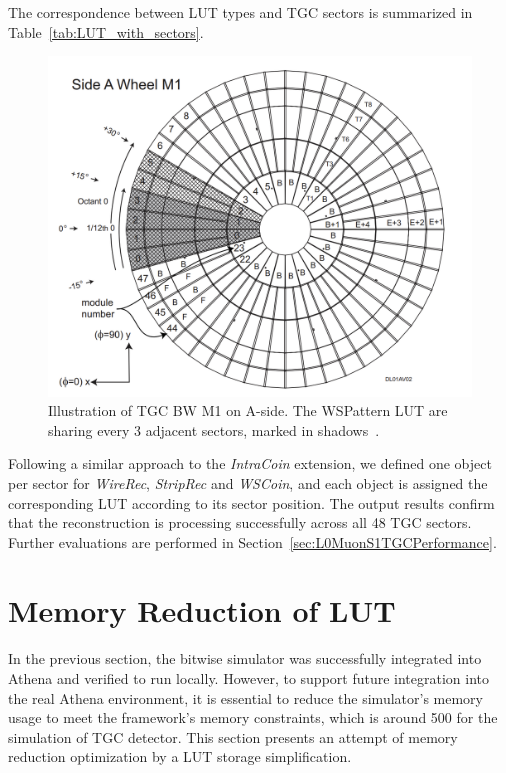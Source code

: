 The correspondence between LUT types and TGC sectors is summarized in Table~\ref{tab:LUT_with_sectors}.


\begin{figure}[htbp]
  \centering
  \includegraphics[width=1.0\textwidth]{figs/chapter5/LUT_sharing.png}
  \caption{Illustration of TGC BW M1 on A-side. The WSPattern LUT are sharing every 3 adjacent sectors, marked in shadows~\cite{TGC_numbering}.}
  \label{fig:LUT_sharing}
\end{figure}


Following a similar approach to the \textit{IntraCoin} extension, we defined one object per sector for \textit{WireRec}, \textit{StripRec} and \textit{WSCoin}, and each object is assigned the corresponding LUT according to its sector position. The output results confirm that the reconstruction is processing successfully across all 48 TGC sectors. Further evaluations are performed in Section~\ref{sec:L0MuonS1TGCPerformance}.
\section{Memory Reduction of LUT} \label{sec:MemoryReduction}
In the previous section, the bitwise simulator was successfully integrated into Athena and verified to run locally. However, to support future integration into the real Athena environment, it is essential to reduce the simulator's memory usage to meet the framework's memory constraints, which is around 500  for the simulation of TGC detector. This section presents an attempt of memory reduction optimization by a LUT storage simplification.

